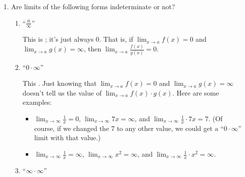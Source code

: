 \documentclass[main]{subfiles}
\begin{document}
\begin{enumerate}[resume]
\item 


  Are limits of the following forms indeterminate or not?

  \begin{enumerate}
  \item
    \begin{problem}[\vfill]
      ``$\displaystyle \frac{0}{\infty}$''
    \end{problem}

    \begin{solution}
      This is ; it's just always 0.  That is, if
      $\displaystyle \lim_{x \to a} f(x) = 0$ and $\displaystyle \lim_{x
        \to a} g(x) = \infty$, then $\displaystyle \lim_{x \to a}
      \frac{f(x)}{g(x)} = 0$.
    \end{solution}

  \item
    \begin{problem}[\vfill]
      ``$0 \cdot \infty$''
    \end{problem}

    \begin{solution}
      This .  Just knowing that $\displaystyle
      \lim_{x \to a} f(x) = 0$ and $\displaystyle \lim_{x \to a} g(x)
      = \infty$ doesn't tell us the value of $\displaystyle \lim_{x \to a}
      f(x) \cdot g(x)$.  Here are some examples:
      \begin{itemize}
      \item $\displaystyle \lim_{x \to \infty} \tfrac{1}{x} = 0$,
        $\displaystyle \lim_{x \to \infty} 7x =
        \infty$, and $\displaystyle \lim_{x \to \infty}
        \tfrac{1}{x} \cdot 7x = 7$.  (Of course, if we changed the 7 to
        any other value, we could get a 
        ``$0 \cdot \infty$'' limit with that value.)
      \item $\displaystyle \lim_{x \to \infty} \tfrac{1}{x} = \infty$,
        $\displaystyle \lim_{x \to \infty} x^2 = \infty$, and
        $\displaystyle \lim_{x \to \infty}
        \tfrac{1}{x} \cdot x^2 = \infty$. 
      \end{itemize}
    \end{solution}

  \item
    \begin{problem}[\vfill]
      ``$\infty \cdot \infty$''
    \end{problem}


\end{enumerate}
\end{enumerate}
\end{document}
